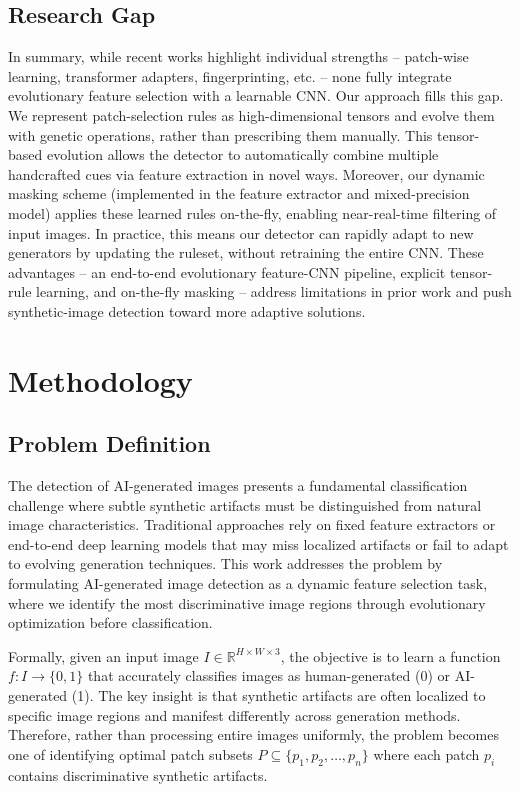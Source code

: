 \documentclass[runningheads]{llncs}
\begin{document}
\subsection{Research Gap}

In summary, while recent works highlight individual strengths – patch-wise learning, transformer adapters, fingerprinting, etc. – none fully integrate evolutionary feature selection with a learnable CNN. Our approach fills this gap. We represent patch-selection rules as high-dimensional tensors and evolve them with genetic operations, rather than prescribing them manually. This tensor-based evolution allows the detector to automatically combine multiple handcrafted cues via feature extraction in novel ways. Moreover, our dynamic masking scheme (implemented in the feature extractor and mixed-precision model) applies these learned rules on-the-fly, enabling near-real-time filtering of input images. In practice, this means our detector can rapidly adapt to new generators by updating the ruleset, without retraining the entire CNN. These advantages – an end-to-end evolutionary feature-CNN pipeline, explicit tensor-rule learning, and on-the-fly masking – address limitations in prior work and push synthetic-image detection toward more adaptive solutions.

\section{Methodology}

\subsection{Problem Definition}
The detection of AI-generated images presents a fundamental classification challenge where subtle synthetic artifacts must be distinguished from natural image characteristics. Traditional approaches rely on fixed feature extractors or end-to-end deep learning models that may miss localized artifacts or fail to adapt to evolving generation techniques. This work addresses the problem by formulating AI-generated image detection as a dynamic feature selection task, where we identify the most discriminative image regions through evolutionary optimization before classification.

Formally, given an input image $I \in \mathbb{R}^{H\times W\times 3}$, the objective is to learn a function $f: I \rightarrow \{0,1\}$ that accurately classifies images as human-generated (0) or AI-generated (1). The key insight is that synthetic artifacts are often localized to specific image regions and manifest differently across generation methods. Therefore, rather than processing entire images uniformly, the problem becomes one of identifying optimal patch subsets $P \subseteq \{p_1, p_2, \ldots, p_n\}$ where each patch $p_i$ contains discriminative synthetic artifacts.
\end{document}
